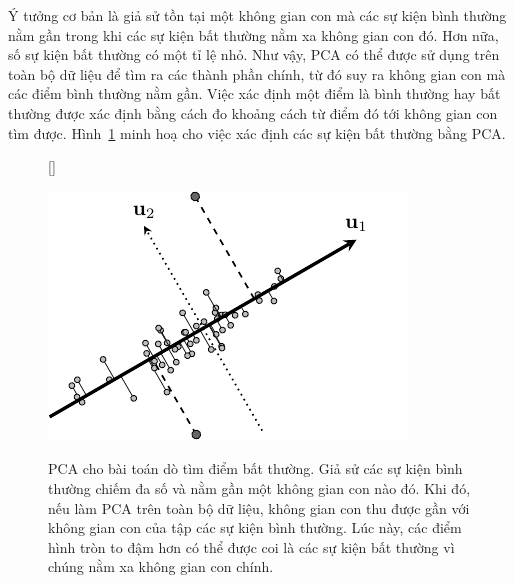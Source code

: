 Ý tưởng cơ bản là giả sử tồn tại một không gian con mà các sự kiện bình thường
nằm gần trong khi các sự kiện bất thường nằm xa không gian con đó. Hơn nữa, số
sự kiện bất thường có một tỉ lệ nhỏ. Như vậy, PCA có thể được sử dụng trên toàn
bộ dữ liệu để tìm ra các thành phần chính, từ đó suy ra không gian con mà các điểm bình thường nằm gần.
Việc xác định một điểm là bình thường hay bất thường được xác định bằng cách đo
khoảng cách từ điểm đó tới không gian con tìm được. Hình~\ref{fig:28_4} minh hoạ
cho việc xác định các sự kiện bất thường bằng PCA.

\begin{figure}[t]

[\FBwidth]
{\caption{ PCA cho bài toán dò tìm điểm bất thường. Giả sử
các sự kiện {bình thường} chiếm đa số và nằm gần  một không
gian con nào đó. Khi đó, nếu làm PCA trên toàn bộ dữ liệu, không gian con
thu được gần với không gian con của tập các sự kiện {bình thường}.
Lúc này, các
điểm hình tròn to đậm hơn có thể được coi là các sự kiện {bất thường} vì chúng nằm xa không gian con chính.}
\label{fig:28_4}}
{ %
\includegraphics[width=.45\textwidth]{Chapters/07_DimemsionalityReduction/28_pca2/latex/abnormal.pdf}
}
\end{figure}


